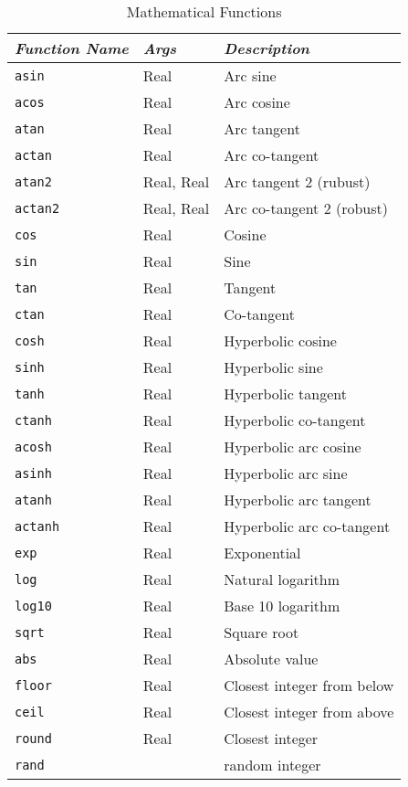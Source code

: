\begin{table}
	\begin{center}
	\caption{Mathematical Functions}\label{tab:MATHP-FUNCTIONS}
	\begin{tabular}{lll}
		\hline
		\emph{Function Name} & \emph{Args} & \emph{Description} \\
		\hline
		\texttt{asin} & Real & Arc sine \\
		\texttt{acos} & Real & Arc cosine \\
		\texttt{atan} & Real & Arc tangent \\
		\texttt{actan} & Real & Arc co-tangent \\
		\texttt{atan2} & Real, Real & Arc tangent 2 (rubust) \\
		\texttt{actan2} & Real, Real & Arc co-tangent 2 (robust) \\
		\texttt{cos} & Real & Cosine \\
		\texttt{sin} & Real & Sine \\
		\texttt{tan} & Real & Tangent \\
		\texttt{ctan} & Real & Co-tangent \\
		\texttt{cosh} & Real & Hyperbolic cosine \\
		\texttt{sinh} & Real & Hyperbolic sine \\
		\texttt{tanh} & Real & Hyperbolic tangent \\
		\texttt{ctanh} & Real & Hyperbolic co-tangent \\
		\texttt{acosh} & Real & Hyperbolic arc cosine \\
		\texttt{asinh} & Real & Hyperbolic arc sine \\
		\texttt{atanh} & Real & Hyperbolic arc tangent \\
		\texttt{actanh} & Real & Hyperbolic arc co-tangent \\
		\texttt{exp} & Real & Exponential \\
		\texttt{log} & Real & Natural logarithm \\
		\texttt{log10} & Real & Base 10 logarithm \\
		\texttt{sqrt} & Real & Square root \\
		\texttt{abs} & Real & Absolute value \\
		\texttt{floor} & Real & Closest integer from below \\
		\texttt{ceil} & Real & Closest integer from above \\
		\texttt{round} & Real & Closest integer \\
		\texttt{rand} & & random integer 

\end{tabular}
\end{center}
\end{table}
